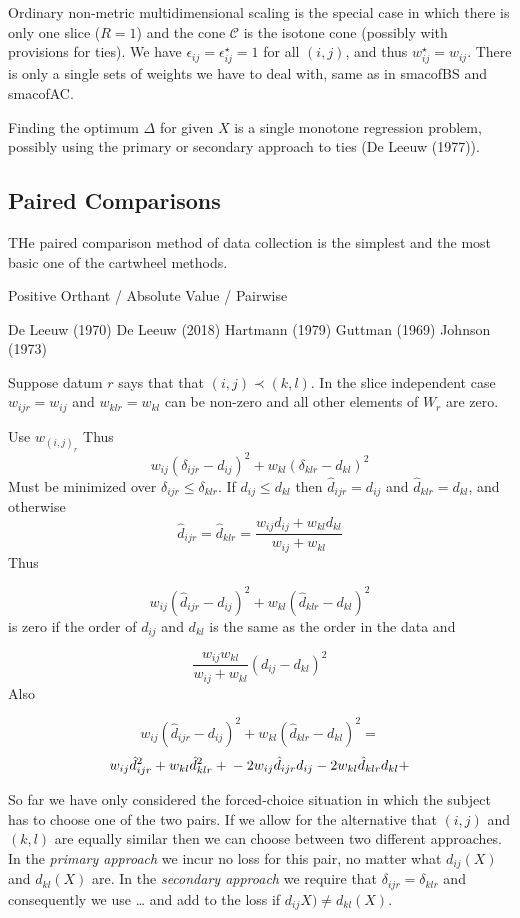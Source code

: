\documentclass[
  12pt,
]{article}
\begin{document}
Ordinary non-metric multidimensional scaling is the special case in which
there is only one slice (\(R=1\)) and the cone \(\mathcal{C}\) is the isotone cone (possibly with provisions for ties). We have \(\epsilon_{ij}=\epsilon_{ij}^\star=1\) for all
\((i,j)\), and thus \(w_{ij}^\star=w_{ij}\). There is only a single sets of weights we have to deal with, same as in smacofBS and smacofAC.

Finding the optimum \(\Delta\) for given \(X\) is a single monotone regression
problem, possibly using the primary or secondary approach to ties (De Leeuw (1977)).

\subsection{Paired Comparisons}\label{paired-comparisons}

THe paired comparison method of data collection is the simplest and
the most basic one of the cartwheel methods.

Positive Orthant / Absolute Value / Pairwise

De Leeuw (1970)
De Leeuw (2018)
Hartmann (1979)
Guttman (1969)
Johnson (1973)

Suppose datum \(r\) says that that \((i,j)\prec(k,l)\). In the slice independent case \(w_{ijr}=w_{ij}\) and \(w_{klr}=w_{kl}\)
can be non-zero and all other elements of \(W_r\) are zero.

Use \(w_{(i,j)_r}\)
Thus
\[
w_{ij}(\delta_{ijr}-d_{ij})^2+w_{kl}(\delta_{klr}-d_{kl})^2
\]
Must be minimized over \(\delta_{ijr}\leq\delta_{klr}\). If \(d_{ij}\leq d_{kl}\)
then \(\hat d_{ijr}=d_{ij}\) and \(\hat d_{klr}=d_{kl}\), and otherwise
\[
\hat d_{ijr}=\hat d_{klr}=\frac{w_{ij}d_{ij}+w_{kl}d_{kl}}{w_{ij}+w_{kl}}
\]
Thus

\[w_{ij}(\hat d_{ijr}-d_{ij})^2+w_{kl}(\hat d_{klr}-d_{kl})^2\]
is zero if the order of \(d_{ij}\) and \(d_{kl}\) is the same as the order in the data
and

\[
\frac{w_{ij}w_{kl}}{w_{ij}+w_{kl}}(d_{ij}-d_{kl})^2
\]
Also

\[w_{ij}(\hat d_{ijr}-d_{ij})^2+w_{kl}(\hat d_{klr}-d_{kl})^2=\]
\[
w_{ij}\hat d_{ijr}^2+w_{kl}\hat d_{klr}^2+\\
-2w_{ij}\hat d_{ijr}d_{ij}-2w_{kl}\hat d_{klr}d_{kl}+
\]

So far we have only considered the forced-choice situation in which
the subject has to choose one of the two pairs. If we allow for the alternative that \((i,j)\) and \((k,l)\) are equally similar then we can choose between two different approaches. In the \emph{primary approach} we incur no loss for this pair, no matter what \(d_{ij}(X)\) and \(d_{kl}(X)\) are. In the \emph{secondary approach} we require that \(\delta_{ijr}=\delta_{klr}\) and consequently we use \ldots{} and add to the loss if
\(d_{ij}X)\not= d_{kl}(X)\).
\end{document}

